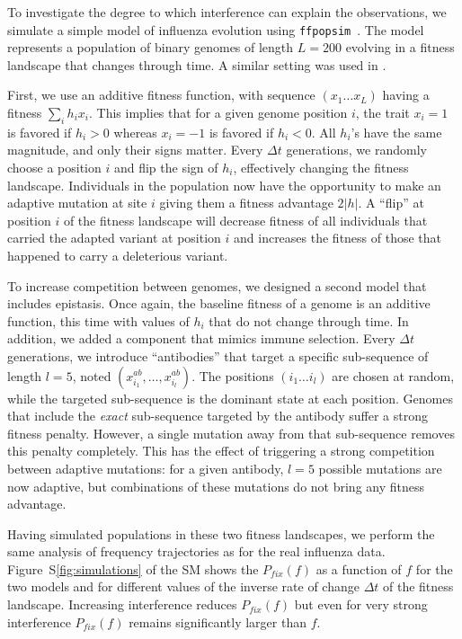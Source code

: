 \documentclass[reprint,amsmath,amssymb,superscriptaddress,showpacs,rmp]{revtex4-1}
\newcommand{\sref}[1]{S\ref{#1}}
\begin{document}
To investigate the degree to which interference can explain the observations, we simulate a simple model of influenza evolution using \texttt{ffpopsim}~\cite{10.1093/bioinformatics/bts633}.
The model represents a population of binary genomes of length $L=200$ evolving in a fitness landscape that changes through time. A similar setting was used in \citep{strelkowa_clonal_2012}.

First, we use an additive fitness function, with sequence $(x_1\ldots x_L)$ having a fitness $\sum_i h_i x_i$.
This implies that for a given genome position $i$, the trait $x_i = 1$ is favored if $h_i>0$ whereas  $x_i = -1$ is favored if $h_i<0$.
All $h_i$'s have the same magnitude, and only their signs matter.
Every $\Delta t$ generations, we randomly choose a position $i$ and flip the sign of $h_i$, effectively changing the fitness landscape.
Individuals in the population now have the opportunity to make an adaptive mutation at site $i$ giving them a fitness advantage $2\vert h \vert$.
A ``flip'' at position $i$ of the fitness landscape will decrease fitness of all individuals that carried the adapted variant at position $i$ and increases the fitness of those that happened to carry a deleterious variant.

To increase competition between genomes, we designed a second model that includes epistasis.
Once again, the baseline fitness of a genome is an additive function, this time with values of $h_i$ that do not change through time.
In addition, we added a component that mimics immune selection.
Every $\Delta t$ generations, we introduce ``antibodies'' that target a specific sub-sequence of length $l=5$, noted $(x^{ab}_{i_1}, \ldots, x^{ab}_{i_l})$.
The positions $(i_1\ldots i_l)$ are chosen at random, while the targeted sub-sequence is the dominant state at each position.
Genomes that include the \emph{exact} sub-sequence targeted by the antibody suffer a strong fitness penalty. However, a single mutation away from that sub-sequence removes this penalty completely.
This has the effect of triggering a strong competition between adaptive mutations: for a given antibody, $l=5$ possible mutations are now adaptive, but combinations of these mutations do not bring any fitness advantage.

Having simulated populations in these two fitness landscapes, we perform the same analysis of frequency trajectories as for the real influenza data.
Figure~\sref{fig:simulations} of the SM shows the $P_{fix}(f)$ as a function of $f$ for the two models and for different values of the inverse rate of change $\Delta t$ of the fitness landscape.
Increasing interference reduces $P_{fix}(f)$ but even for very strong interference $P_{fix}(f)$ remains significantly larger than $f$.
\end{document}
